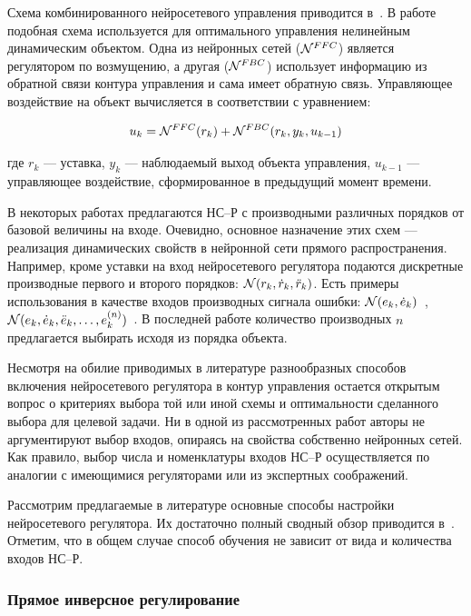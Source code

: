 Схема комбинированного нейросетевого управления приводится
в~\cite{sigom00}.  В работе~\cite{park96} подобная схема используется
для оптимального управления нелинейным динамическим объектом.  Одна из
нейронных сетей ($\mathcal{N}^{FFC}$) является регулятором по возмущению, а
другая ($\mathcal{N}^{FBC}$) использует информацию из обратной связи контура
управления и сама имеет обратную связь.  Управляющее воздействие на
объект вычисляется в соответствии с уравнением:

$$
u_{k}=\mathcal{N}^{FFC}(r_k)+\mathcal{N}^{FBC}(r_k, y_k, u_{k-1})
$$

\noindent
где $r_k$ --- уставка, $y_k$ --- наблюдаемый выход объекта управления,
$u_{k-1}$ --- управляющее воздействие, сформированное в предыдущий
момент времени.

В некоторых работах предлагаются НС--Р с производными различных
порядков от базовой величины на входе.  Очевидно, основное назначение
этих схем --- реализация динамических свойств в нейронной сети прямого
распространения.  Например, кроме уставки на вход нейросетевого
регулятора подаются дискретные производные первого и второго порядков:
$\mathcal{N}(r_k,\dot{r}_k,\ddot{r}_k)$.  Есть примеры использования в
качестве входов производных сигнала ошибки:
$\mathcal{N}(e_k,\dot{e}_k)$~\cite{wailinlin00,linwaihong01},
$\mathcal{N}(e_k,\dot{e}_k,\ddot{e}_k,\ldots,{e}^{(n)}_k)$~\cite{eremin95}.  В
последней работе количество производных $n$ предлагается выбирать
исходя из порядка объекта.

Несмотря на обилие приводимых в литературе разнообразных способов
включения нейросетевого регулятора в контур управления остается
открытым вопрос о критериях выбора той или иной схемы и оптимальности
сделанного выбора для целевой задачи.  Ни в одной из рассмотренных
работ авторы не аргументируют выбор входов, опираясь на свойства
собственно нейронных сетей.  Как правило, выбор числа и номенклатуры
входов НС--Р осуществляется по аналогии с имеющимися регуляторами или
из экспертных соображений.

Рассмотрим предлагаемые в литературе основные способы настройки
нейросетевого регулятора.  Их достаточно полный сводный обзор
приводится в~\cite{sigom00}.  Отметим, что в общем случае способ
обучения не зависит от вида и количества входов НС--Р.

\subsubsection{Прямое инверсное регулирование}%
\label{direct_inv_nnc}

